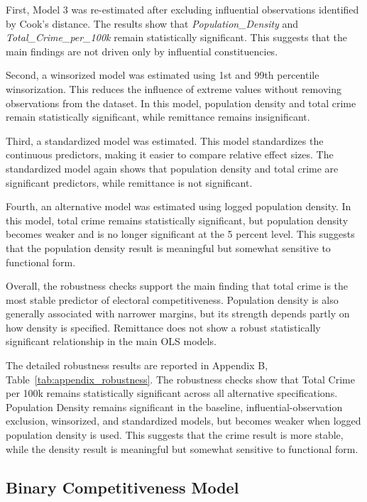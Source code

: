 \documentclass[12pt,a4paper]{article}
\begin{document}
First, Model 3 was re-estimated after excluding influential observations identified by Cook's distance. The results show that \textit{Population\_Density} and \textit{Total\_Crime\_per\_100k} remain statistically significant. This suggests that the main findings are not driven only by influential constituencies.

Second, a winsorized model was estimated using 1st and 99th percentile winsorization. This reduces the influence of extreme values without removing observations from the dataset. In this model, population density and total crime remain statistically significant, while remittance remains insignificant.

Third, a standardized model was estimated. This model standardizes the continuous predictors, making it easier to compare relative effect sizes. The standardized model again shows that population density and total crime are significant predictors, while remittance is not significant.

Fourth, an alternative model was estimated using logged population density. In this model, total crime remains statistically significant, but population density becomes weaker and is no longer significant at the 5 percent level. This suggests that the population density result is meaningful but somewhat sensitive to functional form.

Overall, the robustness checks support the main finding that total crime is the most stable predictor of electoral competitiveness. Population density is also generally associated with narrower margins, but its strength depends partly on how density is specified. Remittance does not show a robust statistically significant relationship in the main OLS models.

The detailed robustness results are reported in Appendix B, Table~\ref{tab:appendix_robustness}. The robustness checks show that Total Crime per 100k remains statistically significant across all alternative specifications. Population Density remains significant in the baseline, influential-observation exclusion, winsorized, and standardized models, but becomes weaker when logged population density is used. This suggests that the crime result is more stable, while the density result is meaningful but somewhat sensitive to functional form.

% 

\subsection{Binary Competitiveness Model}
\end{document}
